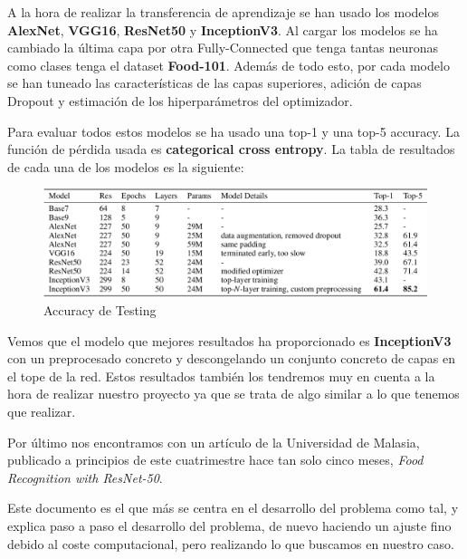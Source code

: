 \vspace{3 mm}

A la hora de realizar la transferencia de aprendizaje se han usado los modelos \textbf{AlexNet}, \textbf{VGG16}, \textbf{ResNet50} y \textbf{InceptionV3}. Al cargar los modelos se ha cambiado la última capa por otra Fully-Connected que tenga tantas neuronas como clases tenga el dataset \textbf{Food-101}. Además de todo esto, por cada modelo se han tuneado las características de las capas superiores, adición de capas Dropout y estimación de los hiperparámetros del optimizador.

\vspace{3 mm}

Para evaluar todos estos modelos se ha usado una top-1 y una top-5 accuracy. La función de pérdida usada es \textbf{categorical cross entropy}. La tabla de resultados de cada una de los modelos es la siguiente:

\vspace{5 mm}

\begin{figure}[H]
  \centering
  \includegraphics[width=1\linewidth]{Imagenes/tablapaper3.png}
  \caption{Accuracy de Testing}
  \label{fig:sub-first}
\end{figure}

\vspace{5 mm}

Vemos que el modelo que mejores resultados ha proporcionado es \textbf{InceptionV3} con un preprocesado concreto y descongelando un conjunto concreto de capas en el tope de la red. Estos resultados también los tendremos muy en cuenta a la hora de realizar nuestro proyecto ya que se trata de algo similar a lo que tenemos que realizar.


\newpage

Por último nos encontramos con un artículo de la Universidad de Malasia, publicado a principios de este cuatrimestre hace tan solo cinco meses,
\textit{Food Recognition with ResNet-50}\cite{food-resnet50}.

Este documento es el que más se centra en el desarrollo del problema como tal, y explica paso a paso el desarrollo del problema, de nuevo haciendo un ajuste fino debido al coste computacional, pero realizando lo que buscamos en nuestro caso.

